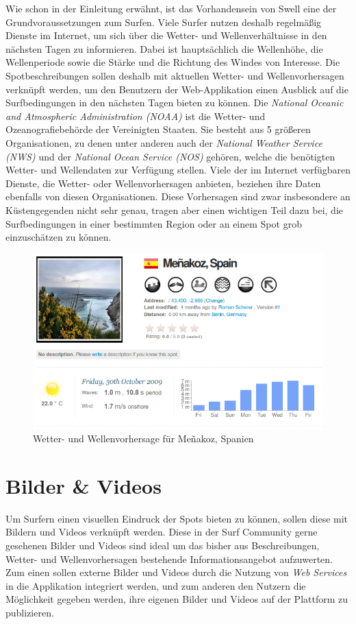 Wie schon in der Einleitung erwähnt, ist das Vorhandensein von Swell
eine der Grundvoraussetzungen zum Surfen. Viele Surfer nutzen deshalb
regelmäßig Dienste im Internet, um sich über die Wetter- und
Wellenverhältnisse in den nächsten Tagen zu informieren. Dabei ist
hauptsächlich die Wellenhöhe, die Wellenperiode sowie die Stärke und
die Richtung des Windes von Interesse. Die Spotbeschreibungen sollen
deshalb mit aktuellen Wetter- und Wellenvorhersagen verknüpft werden,
um den Benutzern der Web-Applikation einen Ausblick auf die
Surfbedingungen in den nächsten Tagen bieten zu können. Die
\textit{National Oceanic and Atmospheric Administration (NOAA)} ist
die Wetter- und Ozeanografiebehörde der Vereinigten Staaten. Sie
besteht aus 5 größeren Organisationen, zu denen unter anderen auch der
\textit{National Weather Service (NWS)}  und der \textit{National Ocean Service (NOS)}
 gehören, welche die
benötigten Wetter- und Wellendaten zur Verfügung stellen. Viele der im
Internet verfügbaren Dienste, die Wetter- oder Wellenvorhersagen
anbieten, beziehen ihre Daten ebenfalls von diesen
Organisationen. Diese Vorhersagen sind zwar insbesondere an
Küstengegenden nicht sehr genau, tragen aber einen wichtigen Teil dazu
bei, die Surfbedingungen in einer bestimmten Region oder an einem Spot
grob einzuschätzen zu können.

\begin{figure}[h]
 \includegraphics[width=\textwidth]{bilder/forecast}
 \caption{Wetter- und Wellenvorhersage für Meñakoz, Spanien}
 \label{forecast}
\end{figure}

\section{Bilder \& Videos}
Um Surfern einen visuellen Eindruck der Spots bieten zu können, sollen
diese mit Bildern und Videos verknüpft werden. Diese in der Surf
Community gerne gesehenen Bilder und Videos sind ideal um das bisher
aus Beschreibungen, Wetter- und Wellenvorhersagen bestehende
Informationsangebot aufzuwerten. Zum einen sollen externe Bilder und
Videos durch die Nutzung von \textit{Web Services} in die Applikation
integriert werden, und zum anderen den Nutzern die Möglichkeit gegeben
werden, ihre eigenen Bilder und Videos auf der Plattform zu
publizieren.


